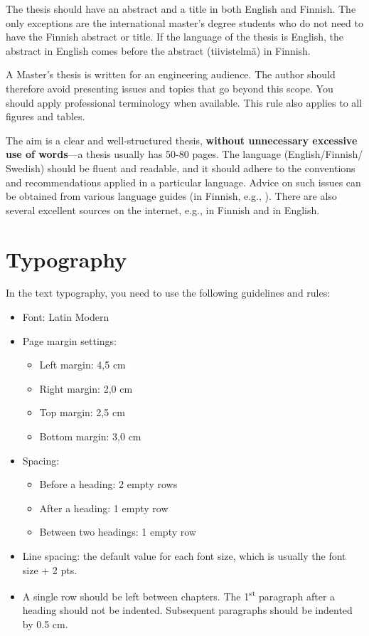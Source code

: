 The thesis should have an abstract and a title in both English and Finnish. The only exceptions are the international master’s degree students who do not need to have the Finnish abstract or title. If the language of the thesis is English, the abstract in English comes before the abstract (tiivistelmä) in Finnish.

A Master’s thesis is written for an engineering audience. The author should therefore avoid presenting issues and topics that go beyond this scope. You should apply professional terminology when available. This rule also applies to all figures and tables.

The aim is a clear and well-structured thesis, \textbf{without unnecessary excessive use of words}---a thesis usually has 50-80 pages. The language (English/Finnish/ Swedish) should be fluent and readable, and it should adhere to the conventions and recommendations applied in a particular language. Advice on such issues can be obtained from various language guides (in Finnish, e.g., \cite{maamies}). There are also several excellent sources on the internet, e.g., \cite{korpela, kielitoimisto} in Finnish and \cite{reportwriting, englishlanguage} in English.

\section{Typography}

In the text typography, you need to use the following guidelines and rules:

\begin{itemize}
    \setlength\itemsep{0pt}
    \setlength\parskip{0pt}
    \item Font: Latin Modern
    \item Page margin settings:
    \begin{itemize}[wide=0pt]
        \setlength\itemsep{0pt}
        \setlength\parskip{0pt}
        \item Left margin: 4,5 cm
        \item Right margin: 2,0 cm
        \item Top margin: 2,5 cm
        \item Bottom margin: 3,0 cm
    \end{itemize}
    \item Spacing:
    \begin{itemize}[wide=0pt]
        \setlength\itemsep{0pt}
        \setlength\parskip{0pt}
        \item Before a heading: 2 empty rows
        \item After a heading: 1 empty row
        \item Between two headings: 1 empty row
    \end{itemize}

    \item Line spacing: the default value for each font size, which is usually the font size +
    2 pts.
    \item A single row should be left between chapters. The 1\textsuperscript{st} paragraph after a heading should not be indented. Subsequent paragraphs should be indented by 0.5 cm.
\end{itemize}

